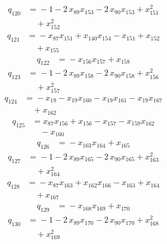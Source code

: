 \begin{align*}
q_{120} &={}-1 -2\,x_{89}x_{153} -2\,x_{90}x_{153} +x_{151}^{2}\\
&\quad +x_{152}^{2}
\end{align*}
\begin{align*}
q_{121} &={}-x_{87}x_{151} +x_{140}x_{154} -x_{151} +x_{152}\\
&\quad +x_{155}
\end{align*}
\begin{align*}
q_{122} &={}-x_{156}x_{157} +x_{158}
\end{align*}
\begin{align*}
q_{123} &={}-1 -2\,x_{89}x_{158} -2\,x_{90}x_{158} +x_{156}^{2}\\
&\quad +x_{157}^{2}
\end{align*}
\begin{align*}
q_{124} &={}-x_{19} -x_{19}x_{160} -x_{19}x_{161} -x_{19}x_{167}\\
&\quad +x_{162}
\end{align*}
\begin{align*}
q_{125} &={}x_{87}x_{156} +x_{156} -x_{157} -x_{159}x_{162}\\
&\quad -x_{160}
\end{align*}
\begin{align*}
q_{126} &={}-x_{163}x_{164} +x_{165}
\end{align*}
\begin{align*}
q_{127} &={}-1 -2\,x_{89}x_{165} -2\,x_{90}x_{165} +x_{163}^{2}\\
&\quad +x_{164}^{2}
\end{align*}
\begin{align*}
q_{128} &={}-x_{87}x_{163} +x_{162}x_{166} -x_{163} +x_{164}\\
&\quad +x_{167}
\end{align*}
\begin{align*}
q_{129} &={}-x_{168}x_{169} +x_{170}
\end{align*}
\begin{align*}
q_{130} &={}-1 -2\,x_{89}x_{170} -2\,x_{90}x_{170} +x_{168}^{2}\\
&\quad +x_{169}^{2}
\end{align*}
